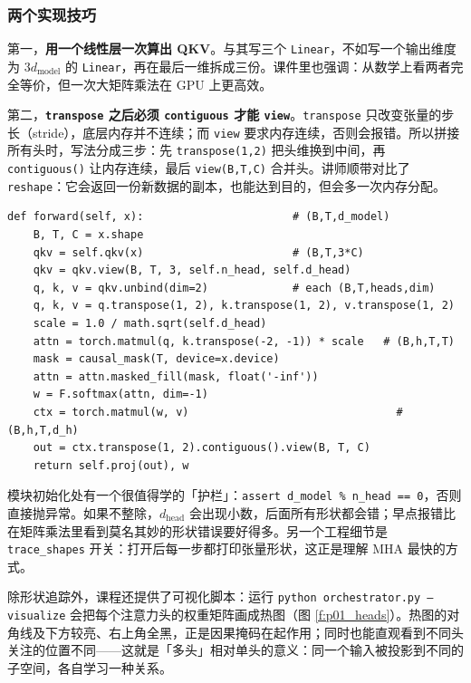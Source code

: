 \subsubsection{两个实现技巧}

第一，\textbf{用一个线性层一次算出 QKV}。与其写三个 \texttt{Linear}，不如写一个输出维度为 $3d_{\text{model}}$ 的 \texttt{Linear}，再在最后一维拆成三份。课件里也强调：从数学上看两者完全等价，但一次大矩阵乘法在 GPU 上更高效。

第二，\textbf{\texttt{transpose} 之后必须 \texttt{contiguous} 才能 \texttt{view}}。\texttt{transpose} 只改变张量的步长（stride），底层内存并不连续；而 \texttt{view} 要求内存连续，否则会报错。所以拼接所有头时，写法分成三步：先 \texttt{transpose(1,2)} 把头维换到中间，再 \texttt{contiguous()} 让内存连续，最后 \texttt{view(B,T,C)} 合并头。讲师顺带对比了 \texttt{reshape}：它会返回一份新数据的副本，也能达到目的，但会多一次内存分配。

\begin{lstlisting}[caption={多头自注意力的核心前向（节选自 \texttt{part\_1/multi\_head.py}）}]
def forward(self, x):                       # (B,T,d_model)
    B, T, C = x.shape
    qkv = self.qkv(x)                       # (B,T,3*C)
    qkv = qkv.view(B, T, 3, self.n_head, self.d_head)
    q, k, v = qkv.unbind(dim=2)             # each (B,T,heads,dim)
    q, k, v = q.transpose(1, 2), k.transpose(1, 2), v.transpose(1, 2)
    scale = 1.0 / math.sqrt(self.d_head)
    attn = torch.matmul(q, k.transpose(-2, -1)) * scale   # (B,h,T,T)
    mask = causal_mask(T, device=x.device)
    attn = attn.masked_fill(mask, float('-inf'))
    w = F.softmax(attn, dim=-1)
    ctx = torch.matmul(w, v)                                # (B,h,T,d_h)
    out = ctx.transpose(1, 2).contiguous().view(B, T, C)
    return self.proj(out), w
\end{lstlisting}

模块初始化处有一个很值得学的「护栏」：\texttt{assert d\_model \% n\_head == 0}，否则直接抛异常。如果不整除，$d_{\text{head}}$ 会出现小数，后面所有形状都会错；早点报错比在矩阵乘法里看到莫名其妙的形状错误要好得多。另一个工程细节是 \texttt{trace\_shapes} 开关：打开后每一步都打印张量形状，这正是理解 MHA 最快的方式。

除形状追踪外，课程还提供了可视化脚本：运行 \texttt{python orchestrator.py --visualize} 会把每个注意力头的权重矩阵画成热图（图 \ref{f:p01_heads}）。热图的对角线及下方较亮、右上角全黑，正是因果掩码在起作用；同时也能直观看到不同头关注的位置不同——这就是「多头」相对单头的意义：同一个输入被投影到不同的子空间，各自学习一种关系。

